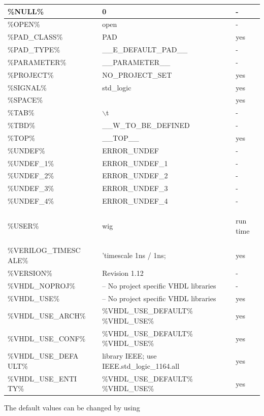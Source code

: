 \documentclass[a4paper,12pt]{article}
\begin{document}
\begin{supertabular}{|p{45mm}|p{6cm}|p{3cm}|l|}
\%NULL\% & 0 & & - \\\hline
\%OPEN\% & open & & - \\\hline
\%PAD\_CLASS\% & PAD & & yes \\\hline
\%PAD\_TYPE\% & \_\_E\_DEFAULT\_PAD\_\_ & & - \\\hline
\%PARAMETER\% & \_\_PARAMETER\_\_ & & - \\\hline
\%PROJECT\% & NO\_PROJECT\_SET & & yes \\\hline
\%SIGNAL\% & std\_logic & & yes \\\hline
\%SPACE\% & & & yes \\\hline
\%TAB\% & $\backslash$t & & - \\\hline
\%TBD\% & \_\_W\_TO\_BE\_DEFINED & & - \\\hline
\%TOP\% & \_\_TOP\_\_ & & yes \\\hline
\%UNDEF\% & ERROR\_UNDEF & & - \\\hline
\%UNDEF\_1\% & ERROR\_UNDEF\_1 & & - \\\hline
\%UNDEF\_2\% & ERROR\_UNDEF\_2 & & - \\\hline
\%UNDEF\_3\% & ERROR\_UNDEF\_3 & & - \\\hline
\%UNDEF\_4\% & ERROR\_UNDEF\_4 & & - \\\hline
\%USER\% & wig & & \begin{it}run time\end{it}\\\hline
\%VERILOG\_TIMESC ALE\% & 'timescale 1ns / 1ns; & & yes \\\hline
\%VERSION\% & Revision 1.12 & & - \\\hline
\%VHDL\_NOPROJ\% & -- No project specific VHDL libraries & & - \\\hline
\%VHDL\_USE\% & -- No project specific VHDL libraries & & yes \\\hline
\%VHDL\_USE\_ARCH\% & \%VHDL\_USE\_DEFAULT\%    \%VHDL\_USE\% & & yes \\\hline
\%VHDL\_USE\_CONF\% & \%VHDL\_USE\_DEFAULT\%    \%VHDL\_USE\% & & yes \\\hline
\%VHDL\_USE\_DEFA ULT\% & library IEEE;  use IEEE.std\_logic\_1164.all & & yes \\\hline
\%VHDL\_USE\_ENTI TY\% & \%VHDL\_USE\_DEFAULT\%    \%VHDL\_USE\% & & yes \\\hline
\end{supertabular}
\newline
\newline
The default values can be changed by using\newline
\end{document}
